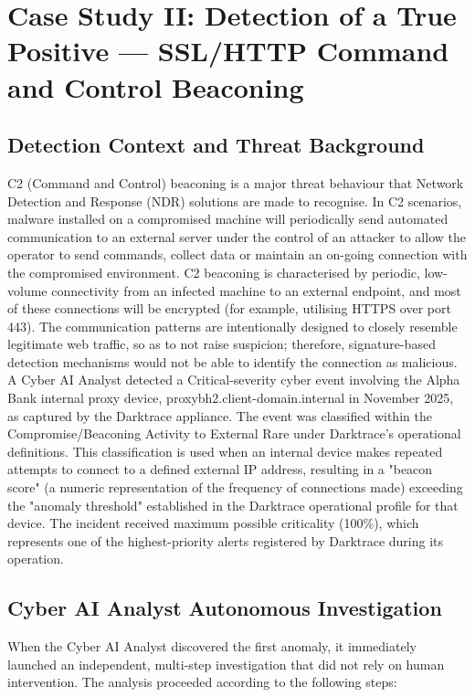 \documentclass[12pt,a4paper]{report}
\begin{document}
\section{ Case Study II: Detection of a True Positive — SSL/HTTP 
Command and Control Beaconing}
\subsection{Detection Context and Threat Background}
C2 (Command and Control) beaconing is a major threat behaviour that Network Detection and Response (NDR) solutions are made to recognise. In C2 scenarios, malware installed on a compromised machine will periodically send automated communication to an external server under the control of an attacker to allow the operator to send commands, collect data or maintain an on-going connection with the compromised environment. C2 beaconing is characterised by periodic, low-volume connectivity from an infected machine to an external endpoint, and most of these connections will be encrypted (for example, utilising HTTPS over port 443). The communication patterns are intentionally designed to closely resemble legitimate web traffic, so as to not raise suspicion; therefore, signature-based detection mechanisms would not be able to identify the connection as malicious.\\

A Cyber AI Analyst detected a Critical-severity cyber event involving the Alpha Bank internal proxy device, proxybh2.client-domain.internal in November 2025, as captured by the Darktrace appliance. The event was classified within the Compromise/Beaconing Activity to External Rare under Darktrace's operational definitions. This classification is used when an internal device makes repeated attempts to connect to a defined external IP address, resulting in a "beacon score" (a numeric representation of the frequency of connections made) exceeding the "anomaly threshold" established in the Darktrace operational profile for that device. The incident received maximum possible criticality (100\%), which represents one of the highest-priority alerts registered by Darktrace during its operation.

\subsection{Cyber AI Analyst Autonomous Investigation}

When the Cyber AI Analyst discovered the first anomaly, it immediately launched an independent, multi-step investigation that did not rely on human intervention. The analysis proceeded according to the following steps:
\end{document}
